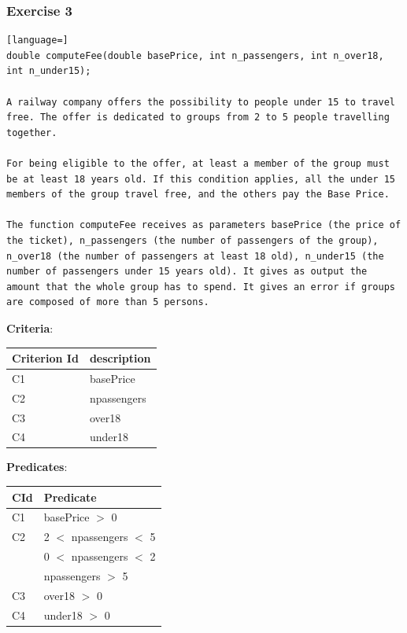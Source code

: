 \documentclass[12pt]{article}
\begin{document}
\subsubsection{Exercise 3}
\begin{lstlisting}[language=]
double computeFee(double basePrice, int n_passengers, int n_over18, int n_under15);

A railway company offers the possibility to people under 15 to travel free. The offer is dedicated to groups from 2 to 5 people travelling together.

For being eligible to the offer, at least a member of the group must be at least 18 years old. If this condition applies, all the under 15 members of the group travel free, and the others pay the Base Price.

The function computeFee receives as parameters basePrice (the price of the ticket), n_passengers (the number of passengers of the group), n_over18 (the number of passengers at least 18 old), n_under15 (the number of passengers under 15 years old). It gives as output the amount that the whole group has to spend. It gives an error if groups are composed of more than 5 persons.
\end{lstlisting}
\textbf{Criteria}:
\begin{center}
  \begin{tabular}{|l|l|}
    \hline
    Criterion Id & description \\
    \hline
    C1 & basePrice \\
    \hline
    C2 & npassengers \\
    \hline
    C3 & over18 \\
    \hline
    C4 & under18 \\
    \hline
  \end{tabular}
\end{center}
\textbf{Predicates}:
\begin{center}
  \begin{tabular}{|l|l|}
    \hline
    CId & Predicate \\
    \hline
    C1 & basePrice $>$ 0 \\
    \hline
    C2 & 2 $<$ npassengers $<$ 5 \\
    \hline
    & 0 $<$ npassengers $<$ 2 \\
    \hline
    & npassengers $>$ 5 \\
    \hline
    C3 & over18 $>$ 0 \\
    \hline
    C4 & under18 $>$ 0 \\
    \hline
  \end{tabular}
\end{center}
\end{document}
